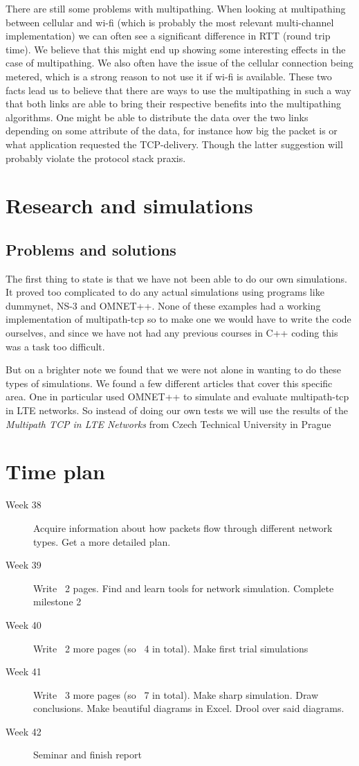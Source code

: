 \documentclass[11pt,twocolumn]{article}
\begin{document}
There are still some problems with multipathing. When looking at multipathing between cellular and wi-fi (which is probably the most relevant multi-channel implementation) we can often see a significant difference in RTT (round trip time). We believe that this might end up showing some interesting effects in the case of multipathing. We also often have the issue of the cellular connection being metered, which is a strong reason to not use it if wi-fi is available. These two facts lead us to believe that there are ways to use the multipathing in such a way that both links are able to bring their respective benefits into the multipathing algorithms. One might be able to distribute the data over the two links depending on some attribute of the data, for instance how big the packet is or what application requested the TCP-delivery. Though the latter suggestion will probably violate the protocol stack praxis.

\section{Research and simulations}

\subsection{Problems and solutions}

The first thing to state is that we have not been able to do our own simulations. It proved too complicated to do any actual simulations using programs like dummynet, NS-3 and OMNET++. None of these examples had a working implementation of multipath-tcp so to make one we would have to write the code ourselves, and since we have not had any previous courses in C++ coding this was a task too difficult.

But on a brighter note we found that we were not alone in wanting to do these types of simulations. We found a few different articles that cover this specific area. One in particular used OMNET++ to simulate and evaluate multipath-tcp in LTE networks. So instead of doing our own tests we will use the results of the \emph{Multipath TCP in LTE Networks} from Czech Technical University in Prague



\section{Time plan}
\begin{description}
\item[Week 38]
Acquire information about how packets flow through different network types. Get a more detailed plan.
\item[Week 39]
Write ~2 pages. Find and learn tools for network simulation. Complete milestone 2
\item[Week 40]
Write ~2 more pages (so ~4 in total). Make first trial simulations
\item[Week 41]
Write ~3 more pages (so ~7 in total). Make sharp simulation. Draw conclusions. Make beautiful diagrams in Excel. Drool over said diagrams.
\item[Week 42]
Seminar and finish report
\end{description}
\end{document}
